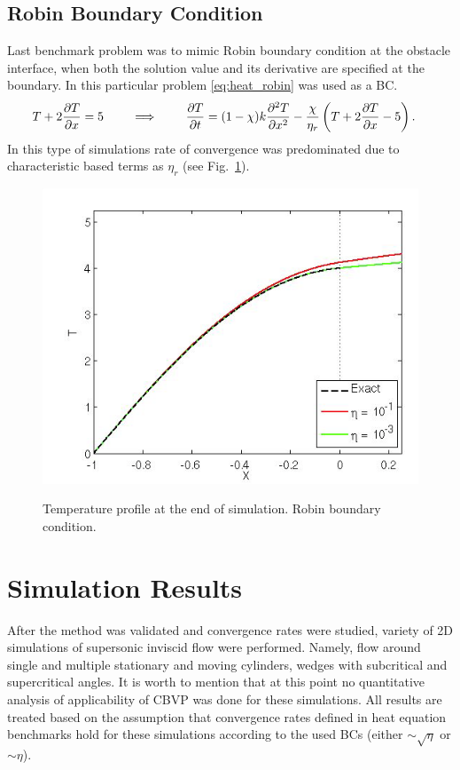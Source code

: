 \subsection{Robin Boundary Condition}
Last benchmark problem was to mimic Robin boundary condition at the obstacle interface, when both the solution value and its derivative are specified at the boundary. In this particular problem \eqref{eq:heat_robin} was used as a BC.
\begin{align}
T + 2 \frac {\partial T}{\partial x} = 5 \qquad \implies \qquad \frac {\partial T}{\partial t} &= (1-\chi)k \frac {\partial^2 T}{\partial x^2} - \frac \chi {\eta_r} \left(T + 2 \frac {\partial T}{\partial x} - 5\right). \label{eq:heat_robin}
\end{align}
In this type of simulations rate of convergence was predominated due to characteristic based terms as $\eta_r$ \cite{ebd_nk_ovv_cbvp_jcp} (see Fig.~\ref{fig:heat_robin}).
\begin{figure}[h!]
\centering \includegraphics[scale=0.6]{fig/heat_robin.png}\\
\caption{Temperature profile at the end of simulation. Robin boundary condition. \label{fig:heat_robin}}
\end{figure} 

\section{Simulation Results}
After the method was validated and convergence rates were studied, variety of 2D simulations of supersonic inviscid flow were performed. Namely, flow around single and multiple stationary and moving cylinders, wedges with subcritical and supercritical angles. It is worth to mention that at this point no quantitative analysis of applicability of CBVP was done for these simulations. All results are treated based on the assumption that convergence rates defined in heat equation benchmarks hold for these simulations according to the used BCs (either $\sim \sqrt \eta$ or $\sim \eta$). 


